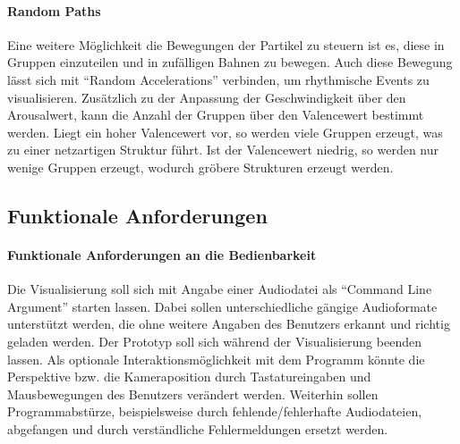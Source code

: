 \documentclass[11pt,a4paper]{article}
\begin{document}
\paragraph{Random Paths}
Eine weitere Möglichkeit die Bewegungen der Partikel zu steuern ist es, diese in Gruppen einzuteilen und in zufälligen Bahnen zu bewegen. Auch diese Bewegung lässt sich mit ``Random Accelerations'' verbinden, um rhythmische Events zu visualisieren. Zusätzlich zu der Anpassung der Geschwindigkeit über den Arousalwert, kann die Anzahl der Gruppen über den Valencewert bestimmt werden. Liegt ein hoher Valencewert vor, so werden viele Gruppen erzeugt, was zu einer netzartigen Struktur führt. Ist der Valencewert niedrig, so werden nur wenige Gruppen erzeugt, wodurch gröbere Strukturen erzeugt werden.

\subsection{Funktionale Anforderungen}
\paragraph{Funktionale Anforderungen an die Bedienbarkeit}
Die Visualisierung soll sich mit Angabe einer Audiodatei als ``Command Line Argument'' starten lassen. Dabei sollen unterschiedliche gängige Audioformate unterstützt werden, die ohne weitere Angaben des Benutzers erkannt und richtig geladen werden. Der Prototyp soll sich während der Visualisierung beenden lassen. Als optionale Interaktionsmöglichkeit mit dem Programm könnte die Perspektive bzw. die Kameraposition durch Tastatureingaben und Mausbewegungen des Benutzers verändert werden. Weiterhin sollen Programmabstürze, beispielsweise durch fehlende/fehlerhafte Audiodateien, abgefangen und durch verständliche Fehlermeldungen ersetzt werden.\\
\end{document}
